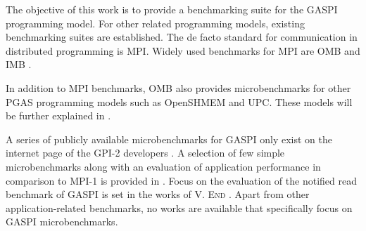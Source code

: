 The objective of this work is to provide a benchmarking suite for the \acs{GASPI} programming model. For other related programming models, existing benchmarking suites are established. The de facto standard for communication in distributed programming is \acs{MPI}. Widely used benchmarks for \acs{MPI} are \acs{OMB} and \acs{IMB} \cite{imb, omb}.

In addition to \acs{MPI} benchmarks, \acs{OMB} also provides microbenchmarks for other \acs{PGAS} programming models such as \acs{OpenSHMEM} and \acs{UPC}. These models will be further explained in .

A series of publicly available microbenchmarks for \acs{GASPI} only exist on the internet page of the \acs{GPI}-2 developers \cite{gpi-2-site}. A selection of few simple microbenchmarks along with an evaluation of application performance in comparison to \acs{MPI}-1 is provided in \cite{gaspi-heuveline}. Focus on the evaluation of the notified read benchmark of \acs{GASPI} is set in the works of V. \textsc{End} \cite{diss-end}. Apart from other application-related benchmarks, no works are available that specifically focus on \acs{GASPI} microbenchmarks.
